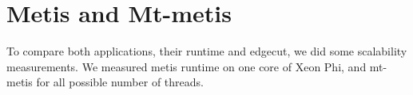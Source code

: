 \documentclass[abstract=on,9pt,twocolumn]{scrartcl}
\begin{document}

\section{Metis and Mt-metis}




\label{sec:metis}
To compare both applications, their runtime and edgecut, we did some
scalability measurements. We measured metis runtime on one core of Xeon Phi, 
and mt-metis for all possible number of threads.
\end{document}
